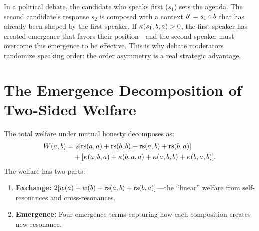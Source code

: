 \begin{example}
In a political debate, the candidate who speaks first ($s_1$) sets the
agenda. The second candidate's response $s_2$ is composed with a context
$b' = s_1 \circ b$ that has already been shaped by the first speaker.
If $\kappa(s_1, b, a) > 0$, the first speaker has created emergence that
favors their position---and the second speaker must overcome this emergence
to be effective. This is why debate moderators randomize speaking order:
the order asymmetry is a real strategic advantage.
\end{example}


\section{The Emergence Decomposition of Two-Sided Welfare}

\begin{theorem}
\label{thm:two-sided-welfare-decomp}
The total welfare under mutual honesty decomposes as:
\begin{align*}
W(a, b) &= 2[\mathrm{rs}(a, a) + \mathrm{rs}(b, b) + \mathrm{rs}(a, b) + \mathrm{rs}(b, a)] \\
&\quad + [\kappa(a, b, a) + \kappa(b, a, a) + \kappa(a, b, b) + \kappa(b, a, b)].
\end{align*}
The welfare has two parts:
\begin{enumerate}
\item \textbf{Exchange:} $2[w(a) + w(b) + \mathrm{rs}(a,b) + \mathrm{rs}(b,a)]$---the
``linear'' welfare from self-resonances and cross-resonances.
\item \textbf{Emergence:} Four emergence terms capturing how each
composition creates new resonance.
\end{enumerate}
\end{theorem}

